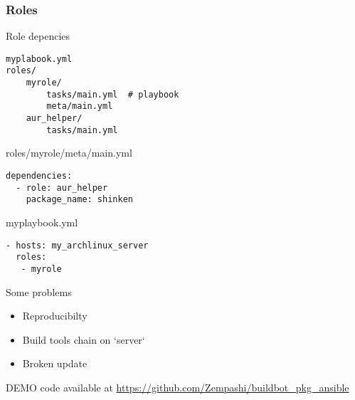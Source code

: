 \documentclass{beamer}
\begin{document}
\begin{frame}[fragile]
\frametitle{Roles}
    \footnotesize{
    \begin{block}{Role depencies}
        \begin{verbatim}
myplabook.yml
roles/
    myrole/
        tasks/main.yml  # playbook
        meta/main.yml
    aur_helper/
        tasks/main.yml
        \end{verbatim}
    \end{block}


    \begin{block}{roles/myrole/meta/main.yml}
        \begin{verbatim}
dependencies:
  - role: aur_helper
    package_name: shinken
        \end{verbatim}
    \end{block}

    \begin{block}{myplaybook.yml}
        \begin{verbatim}
- hosts: my_archlinux_server
  roles:
   - myrole
        \end{verbatim}
    \end{block}
    }
\end{frame}



\begin{frame}
    \begin{alertblock}{Some problems}
        \begin{itemize}
            \item Reproducibilty
            \item Build tools chain on `server`
            \item Broken update
        \end{itemize}
    \end{alertblock}

    \vfill

\end{frame}

\begin{frame}
\end{frame}


\begin{frame}
DEMO
code available at \url{https://github.com/Zempashi/buildbot_pkg_ansible}
\end{frame}

\begin{frame}
\end{frame}
\end{document}
